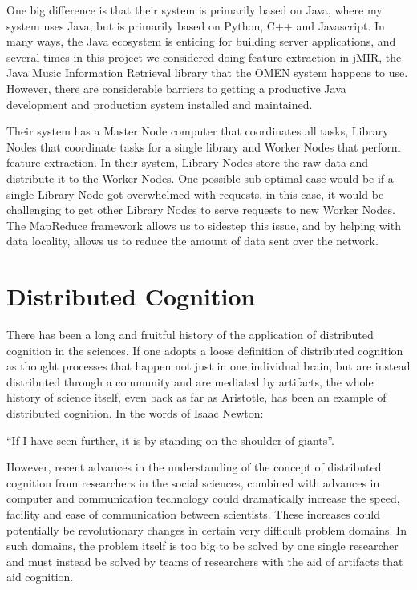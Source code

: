 One big difference is that their system is primarily based on Java,
where my system uses Java, but is primarily based on Python, C++ and
Javascript.  In many ways, the Java ecosystem is enticing for building
server applications, and several times in this project we considered
doing feature extraction in jMIR, the Java Music Information Retrieval
library that the OMEN system happens to use.  However, there are
considerable barriers to getting a productive Java development and
production system installed and maintained.

Their system has a Master Node computer that coordinates all tasks,
Library Nodes that coordinate tasks for a single library and Worker
Nodes that perform feature extraction.  In their system, Library Nodes
store the raw data and distribute it to the Worker Nodes.  One
possible sub-optimal case would be if a single Library Node got
overwhelmed with requests, in this case, it would be challenging to
get other Library Nodes to serve requests to new Worker Nodes.  The
MapReduce framework allows us to sidestep this issue, and by helping
with data locality, allows us to reduce the amount of data sent over
the network.

\section{Distributed Cognition}


There has been a long and fruitful history of the application of
distributed cognition in the sciences.  If one adopts a loose
definition of distributed cognition as thought processes that happen
not just in one individual brain, but are instead distributed through
a community and are mediated by artifacts, the whole history of
science itself, even back as far as Aristotle, has been an example of
distributed cognition.  In the words of Isaac Newton:

 ``If I have seen further, it is by standing on the shoulder of
giants''.

However, recent advances in the understanding of the concept of
distributed cognition from researchers in the social sciences,
combined with advances in computer and communication technology could
dramatically increase the speed, facility and ease of communication
between scientists.  These increases could potentially be
revolutionary changes in certain very difficult problem domains.  In
such domains, the problem itself is too big to be solved by one single
researcher and must instead be solved by teams of researchers with the
aid of artifacts that aid cognition.

